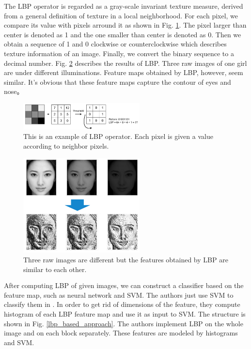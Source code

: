 \documentclass[journal]{IEEEtran}
\begin{document}
The LBP operator \cite{ojala2002multiresolution} is regarded as a gray-scale invariant texture measure, derived from a general definition of texture in a local neighborhood. For each pixel, we compare its value with pixels arround it as shown in Fig. \ref{LBP}. The pixel larger than center is denoted as 1 and the one smaller than center is denoted as 0. Then we obtain a sequence of 1 and 0 clockwise or counterclockwise which describes texture information of an image. Finally, we convert the binary sequence to a decimal number. Fig. \ref{results_of_LBP} describes the results of LBP. Three raw images of one girl are under different illuminations. Feature maps obtained by LBP, however, seem similar. It's obvious that these feature maps capture the contour of eyes and nose。

\begin{figure}[!t]
\centering
\includegraphics[width=2.5in]{img/2-A-(3).png}
\caption{This is an example of LBP operator. Each pixel is given a value according to neighbor pixels. \cite{maatta2011face}}
\label{LBP}
\end{figure}

\begin{figure}[!t]
\centering
\includegraphics[width=2.5in]{img/2-A-(4).png}
\caption{Three raw images are different but the features obtained by LBP are similar to each other.}
\label{results_of_LBP}
\end{figure}

After computing LBP of given images, we can construct a classifier based on the feature map, such as neural network and SVM. The authors just use SVM to classify them in \cite{chingovska2012effectiveness}\cite{maatta2011face}. In order to get rid of dimensions of the feature, they compute histogram of each LBP feature map and use it as input to SVM. The structure is shown in Fig. \ref{lbp_based_approach}. The authors implement LBP on the whole image and on each block separately. These features are modeled by histograms and SVM. 
\end{document}
